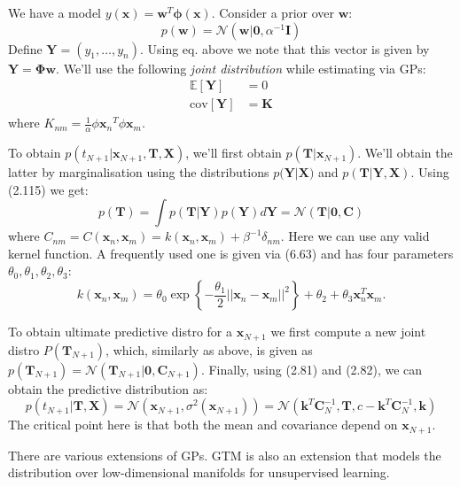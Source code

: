 \documentclass[a4paper]{article}
\newcommand{\mb}{\mathbf}
\newcommand{\rnote}[1]{#1\reversemarginpar\marginpar{{\textit{{\textcolor{red}{#1}}}}}}
\begin{document}
We have a model $y(\mb{x})=\mb{w}^T\mb{\phi}(\mb{x})$. Consider a prior over $\mb{w}$:
%
\begin{equation}
p(\mb{w}) = \mathcal{N}(\mb{w}|\mb{0}, \alpha^{-1}\mb{I})
\end{equation}
%
%
Define $\mb{Y}=(y_1,\hdots,y_n)$. Using eq. above we note that this vector is given by $\mb{Y}=\mb{\Phi w}$. We'll use the following \textit{joint distribution} while estimating via GPs: 
%
\begin{align}
\mathbb{E}[\mb{Y}] &= 0 \\
\text{cov}[\mb{Y}] &= \mb{K}
\end{align}
%
where $K_{nm} = \frac{1}{\alpha}\phi{\mb{x}_n}^T\phi{\mb{x}_m}$.

To obtain $p(t_{N+1}|\mb{x}_{N+1},\mb{T},\mb{X})$, we'll first obtain $p(\mb{T}|\mb{x}_{N+1})$. We'll obtain the latter by marginalisation using the distributions $p\mb{(\mb{Y}|\mb{X}})$ and $p\mb{(T|Y,X)}$. Using (2.115) we get:
%
\begin{equation}
p(\mb{T}) = \int p(\mb{T|Y})p(\mb{Y})d\mb{Y} = \mathcal{N}(\mb{T}|\mb{0,C})
\end{equation}
%
%
where $C_{nm}=C(\mb{x}_n,\mb{x}_m)=k(\mb{x}_n,\mb{x}_m)+\beta^{-1} \delta_{nm}$. Here we can use any valid kernel function. A frequently used one is given via (6.63) and has four parameters $\theta_0,\theta_1,\theta_2,\theta_3$:
%
\begin{equation}
k(\mb{x}_n,\mb{x}_m) = \theta_0 \exp\left\{-\frac{\theta_1}{2} ||\mb{x}_n-\mb{x}_m||^2 \right\}+\theta_2+\theta_3\mb{x}_n^T\mb{x}_m.
\end{equation}


To obtain ultimate predictive distro for a $\mb{x}_{N+1}$ we first compute a new joint distro $P(\mb{T}_{N+1})$, which, similarly as above, is given as $p(\mb{T}_{N+1})=\mathcal{N}(\mb{T}_{N+1}|\mb{0}, \mb{C}_{N+1})$. 
Finally, using (2.81) and (2.82), we can obtain the predictive distribution as:
%
\begin{equation}
p(t_{N+1}|\mb{T,X})=\mathcal{N}(\mb{x}_{N+1},\sigma^2(\mb{x}_{N+1}))=\mathcal{N}(\mb{k}^T\mb{C}_{N}^{-1},\mb{T},c-\mb{k}^T \mb{C}_N^{-1},\mb{k})
\label{eq:GP}
\end{equation}
%
The critical point here is that both the mean and covariance depend on $\mb{x}_{N+1}$.

There are various extensions of GPs. GTM is also an extension that models the \rnote{distribution over low-dimensional manifolds for unsupervised learning}.
\end{document}

